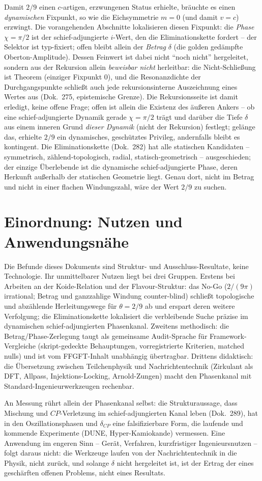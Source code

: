 Damit $2/9$ einen $c$-artigen, erzwungenen Status erhielte, bräuchte es einen \emph{dynamischen}
Fixpunkt, so wie die Eichsymmetrie $m=0$ (und damit $v=c$) erzwingt. Die vorangehenden
Abschnitte lokalisieren diesen Fixpunkt: die \emph{Phase} $\chi=\pi/2$ ist der schief-adjungierte
$i$-Wert, den die Eliminationskette fordert -- der Selektor ist typ-fixiert; offen bleibt allein
der \emph{Betrag} $\delta$ (die golden gedämpfte Oberton-Amplitude). Dessen Feinwert ist dabei
nicht \enquote{noch nicht} hergeleitet, sondern aus der Rekursion allein \emph{beweisbar nicht}
herleitbar: die Nicht-Schließung ist Theorem (einziger Fixpunkt $0$), und die Resonanzdichte der
Durchgangspunkte schließt auch jede rekursionsinterne Auszeichnung eines Wertes aus (Dok.~275,
epistemische Grenze). Die Rekursionsseite ist damit erledigt, keine offene Frage; offen ist allein
die Existenz des äußeren Ankers -- ob eine schief-adjungierte Dynamik gerade $\chi=\pi/2$ trägt
und darüber die Tiefe $\delta$ aus einem inneren Grund \emph{dieser Dynamik} (nicht der Rekursion)
festlegt; gelänge das,
erhielte $2/9$ ein dynamisches, geschütztes Privileg, andernfalls bleibt es kontingent. Die
Eliminationskette (Dok.~282) hat alle statischen Kandidaten -- symmetrisch, zählend-topologisch,
radial, statisch-geometrisch -- ausgeschieden; der einzige Überlebende ist die dynamische
schief-adjungierte Phase, deren Herkunft außerhalb der statischen Geometrie liegt. Genau dort,
nicht im Betrag und nicht in einer flachen Windungszahl, wäre der Wert $2/9$ zu suchen.

\section{Einordnung: Nutzen und Anwendungsnähe}
Die Befunde dieses Dokuments sind Struktur- und Ausschluss-Resultate, keine Technologie. Ihr
unmittelbarer Nutzen liegt bei drei Gruppen. Erstens bei Arbeiten an der Koide-Relation und der
Flavour-Struktur: das No-Go ($2/(9\pi)$ irrational; Betrag und ganzzahlige Windung
counter-blind) schließt topologische und abzählende Herleitungswege für $\theta=2/9$ ab und
erspart deren weitere Verfolgung; die Eliminationskette lokalisiert die verbleibende Suche
präzise im dynamischen schief-adjungierten Phasenkanal. Zweitens methodisch: die
Betrag/Phase-Zerlegung taugt als gemeinsame Audit-Sprache für Framework-Vergleiche
(skript-gedeckte Behauptungen, vorregistrierte Kriterien, matched nulls) und ist vom
FFGFT-Inhalt unabhängig übertragbar. Drittens didaktisch: die Übersetzung zwischen
Teilchenphysik und Nachrichtentechnik (Zirkulant als DFT, Allpass, Injektions-Locking,
Arnold-Zungen) macht den Phasenkanal mit Standard-Ingenieurwerkzeugen rechenbar.

An Messung rührt allein der Phasenkanal selbst: die Strukturaussage, dass Mischung und
$CP$-Verletzung im schief-adjungierten Kanal leben (Dok.~289), hat in den Oszillationsphasen
und $\delta_{CP}$ eine falsifizierbare Form, die laufende und kommende Experimente (DUNE,
Hyper-Kamiokande) vermessen. Eine Anwendung im engeren Sinn -- Gerät, Verfahren, kurzfristiger
Ingenieursnutzen -- folgt daraus nicht: die Werkzeuge laufen von der Nachrichtentechnik in die
Physik, nicht zurück, und solange $\delta$ nicht hergeleitet ist, ist der Ertrag der eines
geschärften offenen Problems, nicht eines Resultats.
